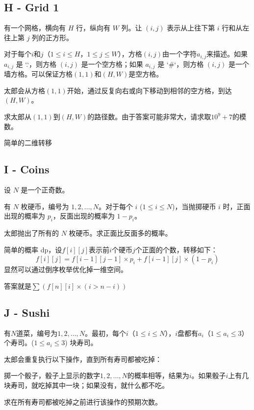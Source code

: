 \subsection{H - Grid 1}
\begin{framed}
    有一个网格，横向有 $H$ 行，纵向有 $W$ 列。让 $(i, j)$ 表示从上往下第 $i$ 行和从左往上第 $j$ 列的正方形。

    对于每个$i$和$j$（$1 \leq i \leq H$，$1 \leq j \leq W$），方格$(i, j)$由一个字符$a_{i, j}$来描述。如果 $a_{i, j}$ 是 `.`，则方格 $(i, j)$ 是一个空方格；如果 $a_{i, j}$ 是 `#`，则方格 $(i, j)$ 是一个墙方格。可以保证方格$(1, 1)$和$(H, W)$是空方格。

    太郎会从方格$(1, 1)$开始，通过反复向右或向下移动到相邻的空方格，到达$(H, W)$。

    求太郎从$(1, 1)$到$(H, W)$的路径数。由于答案可能非常大，请求取$10^9 + 7$的模数。
\end{framed}
简单的二维转移


\subsection{I - Coins}
\begin{framed}
    设 $N$ 是一个正奇数。

    有 $N$ 枚硬币，编号为 $1, 2, \ldots, N$。对于每个 $i$ ($1 \leq i \leq N$)，当抛掷硬币 $i$ 时，正面出现的概率为 $p_i$，反面出现的概率为 $1 - p_i$。

    太郎抛出了所有的 $N$ 枚硬币。求正面比反面多的概率。
\end{framed}
简单的概率 dp，设$f[i][j]$表示前$i$个硬币$j$个正面的个数，转移如下：
$$
f[i][j]=f[i-1][j-1]\times p_i + f[i-1][j] \times (1 - p_i)
$$
显然可以通过倒序枚举优化掉一维空间。

答案就是$\sum (f[n][i] \times( i > n - i ))$



\subsection{J - Sushi}
\begin{framed}
    有$N$道菜，编号为$1, 2, \ldots, N$。最初，每个$i$（$1 \leq i \leq N$），$i$盘都有$a_i$（$1 \leq a_i \leq 3$）个寿司。($1 \leq a_i \leq 3$) 块寿司。

    太郎会重复执行以下操作，直到所有寿司都被吃掉：

    掷一个骰子，骰子上显示的数字$1, 2, \ldots, N$的概率相等，结果为$i$。如果骰子$i$上有几块寿司，就吃掉其中一块；如果没有，就什么都不吃。

    求在所有寿司都被吃掉之前进行该操作的预期次数。
\end{framed}

